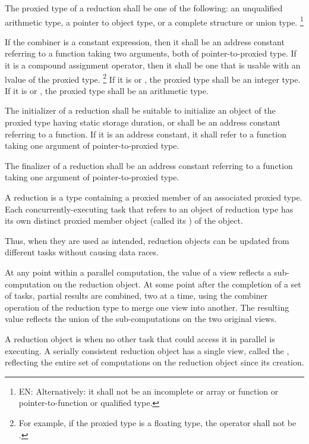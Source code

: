 \pnum
The proxied type of a reduction shall be
one of the following:
an unqualified arithmetic type,
a pointer to object type,
or a complete structure or union type.%
\footnote{EN:
Alternatively: it shall not be
an incomplete or array or function
or pointer-to-function or qualified type.
}

\pnum
If the combiner is a constant expression,
then it shall be an address constant
referring to a function taking two arguments,
both of pointer-to-proxied type.
If it is a compound assignment operator,
then it shall be one that is usable with an lvalue of the proxied type.%
\footnote{
For example, if the proxied type is a floating type,
the operator shall not be
\tcode{|=}.
}
If it is
or
,
the proxied type shall be an integer type.
If it is
or
,
the proxied type shall be an arithmetic type.

\pnum
The initializer of a reduction
shall be suitable to initialize
an object of the proxied type
having static storage duration,
or shall be an address constant referring to a function.
If it is an address constant,
it shall refer to a function
taking one argument of pointer-to-proxied type.

\pnum
The finalizer of a reduction
shall be an address constant referring to a function
taking one argument of pointer-to-proxied type.


\pnum
A reduction is a type containing a proxied member
of an associated proxied type.
Each concurrently-executing task
that refers to an object of reduction type
has its own distinct proxied member object
(called its
)
of the object.

\begin{note}
Thus, when they are used as intended,
reduction objects can be updated from different tasks
without causing data races.
\end{note}

\pnum
At any point within a parallel computation,
the value of a view reflects a sub-computation on the reduction object.
At some point after the completion of a set of tasks,
partial results are combined, two at a time,
using the combiner operation of the reduction type
to merge one view into another.
The resulting value reflects the union
of the sub-computations on the two original views.
 
\pnum
A reduction object is
when no other task that could access it in parallel is executing.
A serially consistent reduction object has a single view,
called the
,
reflecting the entire set of computations on the reduction object
since its creation.
 
